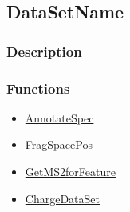 \subsection{DataSetName}\label{DataSetName}
\subsubsection{Description}


\subsubsection{Functions}
\begin{itemize}
\item \hyperref[AnnotateSpec]{AnnotateSpec}
\item \hyperref[FragSpacePos]{FragSpacePos}
\item \hyperref[GetMS2forFeature]{GetMS2forFeature}
\item \hyperref[ChargeDataSet]{ChargeDataSet}
\end{itemize}

